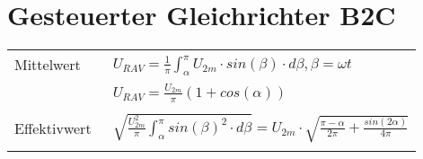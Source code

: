 \section{Gesteuerter Gleichrichter B2C}
\begin{tabular}{ll}
  Mittelwert &\ $U_{R AV} = \frac{1}{\pi}\int_{\alpha}^{\pi}U_{2m} \cdot sin(\beta) \cdot d\beta, \beta = \omega t$\\
  &\ $U_{R AV} = \frac{U_{2m}}{\pi}(1 + cos(\alpha))$\\\\
  Effektivwert &\ $\sqrt{\frac{U_{2m}^2}{\pi}\int_{\alpha}^{\pi}sin(\beta)^2 \cdot d\beta} = U_{2m} \cdot \sqrt{\frac{\pi-\alpha}{2\pi}+\frac{sin(2\alpha)}{4\pi}}$\\\\
\end{tabular}